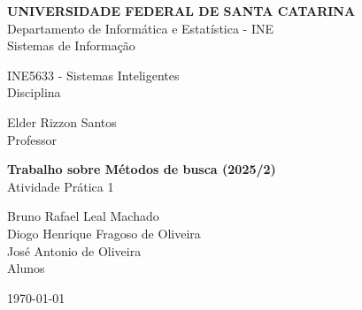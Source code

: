 \begin{titlepage}
\begin{center}
\textbf{UNIVERSIDADE FEDERAL DE SANTA CATARINA}\\
Departamento de Informática e Estatística - INE\\
Sistemas de Informação\\

\vspace{3cm}

INE5633 - Sistemas Inteligentes\\
{\footnotesize{Disciplina}}\\
\vspace{1cm}

Elder Rizzon Santos\\
{\footnotesize{Professor}}

\vspace{4cm}

{\large{\textbf{Trabalho sobre Métodos de busca (2025/2)}}\\ \footnotesize{Atividade Prática 1}}


\vspace{6cm}
Bruno Rafael Leal Machado\\
Diogo Henrique Fragoso de Oliveira\\
José Antonio de Oliveira\\
\footnotesize{Alunos}

\vfill

\today  

\end{center}

\end{titlepage}


